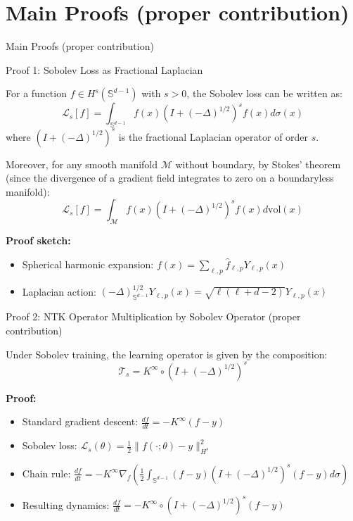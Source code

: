 \documentclass{beamer}
\begin{document}
\section{Main Proofs (proper contribution)}

\begin{frame}
\begin{center}
\huge{Main Proofs}
\vspace{0.5cm}
\large{(proper contribution)}
\end{center}
\end{frame}

\begin{frame}{Proof 1: Sobolev Loss as Fractional Laplacian}
\begin{theorem}
For a function $f \in H^s(\mathbb{S}^{d-1})$ with $s > 0$, the Sobolev loss can be written as:
\[ \mathcal{L}_s[f] = \int_{\mathbb{S}^{d-1}} f(x) (I + (-\Delta)^{1/2})^s f(x) d\sigma(x) \]
where $(I + (-\Delta)^{1/2})^s$ is the fractional Laplacian operator of order $s$.

Moreover, for any smooth manifold $\mathcal{M}$ without boundary, by Stokes' theorem (since the divergence of a gradient field integrates to zero on a boundaryless manifold):
\[ \mathcal{L}_s[f] = \int_{\mathcal{M}} f(x) (I + (-\Delta)^{1/2})^s f(x) d\text{vol}(x) \]
\end{theorem}

\textbf{Proof sketch:}
\begin{itemize}
\item Spherical harmonic expansion: $f(x) = \sum_{\ell,p} \hat{f}_{\ell,p} Y_{\ell,p}(x)$
\item Laplacian action: $(-\Delta)^{1/2}_{\mathbb{S}^{d-1}} Y_{\ell,p}(x) = \sqrt{\ell(\ell + d - 2)} Y_{\ell,p}(x)$
\end{itemize}
\end{frame}

\begin{frame}{Proof 2: NTK Operator Multiplication by Sobolev Operator (proper contribution)}
\begin{theorem}
Under Sobolev training, the learning operator is given by the composition:
\[ \mathcal{T}_s = K^{\infty} \circ (I + (-\Delta)^{1/2})^s \]
\end{theorem}

\textbf{Proof:}
\begin{itemize}
\item Standard gradient descent: $\frac{df}{dt} = -K^{\infty}(f - y)$
\item Sobolev loss: $\mathcal{L}_s(\theta) = \frac{1}{2}\|f(\cdot; \theta) - y\|^2_{H^s}$
\item Chain rule: $\frac{df}{dt} = -K^{\infty} \nabla_f \left(\frac{1}{2}\int_{\mathbb{S}^{d-1}} (f-y)(I + (-\Delta)^{1/2})^s(f-y) d\sigma\right)$
\item Resulting dynamics: $\frac{df}{dt} = -K^{\infty} \circ (I + (-\Delta)^{1/2})^s (f - y)$
\end{itemize}
\end{frame}
\end{document}
